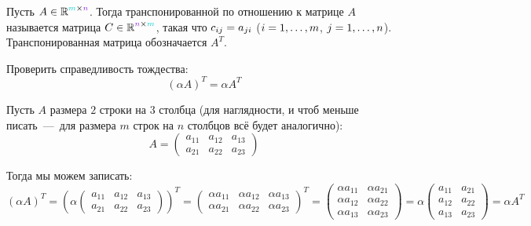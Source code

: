 \documentclass[a4paper,12pt]{article}
\begin{document}
  \begin{definition}
    Пусть $A \hm\in \RR^{\textcolor{light-cyan}{m} \times \textcolor{light-purple}{n}}$.
    Тогда транспонированной по отношению к матрице $A$ называется матрица $C \hm\in \RR^{\textcolor{light-purple}{n} \times \textcolor{light-cyan}{m}}$, такая что $c_{ij} \hm= a_{ji}$ ($i \hm= 1, \ldots, m$, $j \hm= 1, \ldots, n$).
    Транспонированная матрица обозначается $A^T$.
  \end{definition}
  
  \begin{problem}[15.13(1)]
    Проверить справедливость тождества:
    \[
      (\alpha A)^T = \alpha A^T
    \]
  \end{problem}
  
  \begin{solution}
    Пусть $A$ размера $2$ строки на $3$ столбца (для наглядности, и чтоб меньше писать~---~для размера $m$ строк на $n$ столбцов всё будет аналогично):
    \[
      A = \begin{pmatrix}
        a_{11} & a_{12} & a_{13}\\
        a_{21} & a_{22} & a_{23}
      \end{pmatrix}
    \]
    
    Тогда мы можем записать:
    \begin{equation*}
      (\alpha A)^T
      = \left(
          \alpha \begin{pmatrix}
            a_{11} & a_{12} & a_{13}\\
            a_{21} & a_{22} & a_{23}
          \end{pmatrix}
        \right)^T
      = \begin{pmatrix}
          \alpha a_{11} & \alpha a_{12} & \alpha a_{13}\\
          \alpha a_{21} & \alpha a_{22} & \alpha a_{23}
        \end{pmatrix}^T
      = \begin{pmatrix}
          \alpha a_{11} & \alpha a_{21}\\
          \alpha a_{12} & \alpha a_{22}\\
          \alpha a_{13} & \alpha a_{23}
        \end{pmatrix}
      = \alpha \begin{pmatrix}
          a_{11} & a_{21}\\
          a_{12} & a_{22}\\
          a_{13} & a_{23}
         \end{pmatrix}
      = \alpha A^T
    \end{equation*}
  \end{solution}
  
\end{document}

